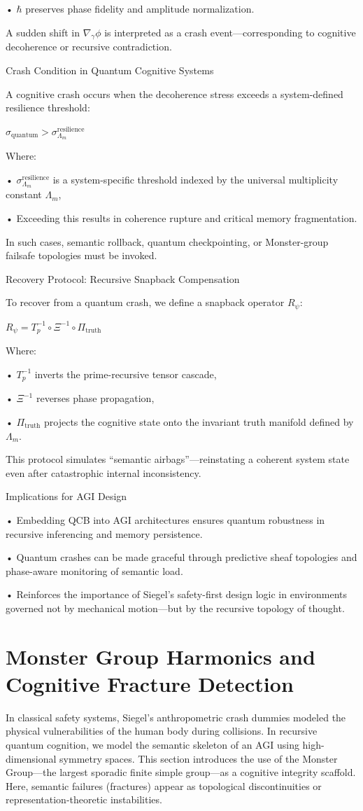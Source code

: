 \documentclass[11pt]{article}
\begin{document}
• $\hbar$ preserves phase fidelity and amplitude normalization.

A sudden shift in $\nabla_\gamma \phi$ is interpreted as a crash event—corresponding to cognitive decoherence or recursive contradiction.

Crash Condition in Quantum Cognitive Systems

A cognitive crash occurs when the decoherence stress exceeds a system-defined resilience threshold:

$\sigma_{\text{quantum}} > \sigma_{\Lambda_m}^{\text{resilience}}$

Where:

• $\sigma_{\Lambda_m}^{\text{resilience}}$ is a system-specific threshold indexed by the universal multiplicity constant $\Lambda_m$,

• Exceeding this results in coherence rupture and critical memory fragmentation.

In such cases, semantic rollback, quantum checkpointing, or Monster-group failsafe topologies must be invoked.

Recovery Protocol: Recursive Snapback Compensation

To recover from a quantum crash, we define a snapback operator $R_\psi$:

$R_\psi = T_p^{-1} \circ \Xi^{-1} \circ \Pi_{\text{truth}}$

Where:

• $T_p^{-1}$ inverts the prime-recursive tensor cascade,

• $\Xi^{-1}$ reverses phase propagation,

• $\Pi_{\text{truth}}$ projects the cognitive state onto the invariant truth manifold defined by $\Lambda_m$.

This protocol simulates “semantic airbags”—reinstating a coherent system state even after catastrophic internal inconsistency.

Implications for AGI Design

• Embedding QCB into AGI architectures ensures quantum robustness in recursive inferencing and memory persistence.

• Quantum crashes can be made graceful through predictive sheaf topologies and phase-aware monitoring of semantic load.

• Reinforces the importance of Siegel’s safety-first design logic in environments governed not by mechanical motion—but by the recursive topology of thought.

\section{Monster Group Harmonics and Cognitive Fracture Detection}
In classical safety systems, Siegel’s anthropometric crash dummies modeled the physical vulnerabilities of the human body during collisions. In recursive quantum cognition, we model the semantic skeleton of an AGI using high-dimensional symmetry spaces. This section introduces the use of the Monster Group—the largest sporadic finite simple group—as a cognitive integrity scaffold. Here, semantic failures (fractures) appear as topological discontinuities or representation-theoretic instabilities.
\end{document}
